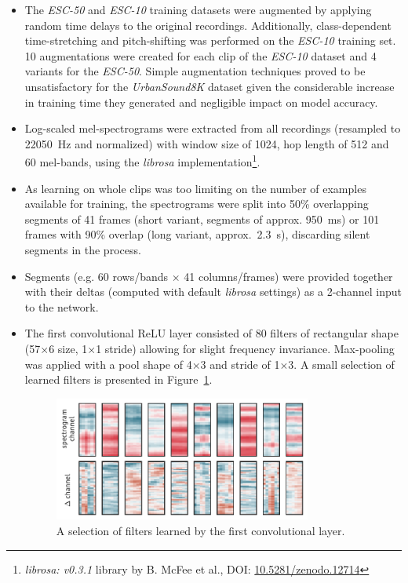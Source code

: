\documentclass{article}
\begin{document}
\begin{itemize}[noitemsep,topsep=0pt,leftmargin=12pt]
\itemsep0em
\item The \textit{ESC-50} and \textit{ESC-10} training datasets were augmented by applying random time delays to the original recordings. Additionally, class-dependent time-stretching and pitch-shifting was performed on the \textit{ESC-10} training set. 10 augmentations were created for each clip of the \textit{ESC-10} dataset and 4 variants for the \textit{ESC-50}. Simple augmentation techniques proved to be unsatisfactory for the \textit{UrbanSound8K} dataset given the considerable increase in training time they generated and negligible impact on model accuracy.

\item Log-scaled mel-spectrograms were extracted from all recordings (resampled to 22050~Hz and normalized) with window size of 1024, hop length of 512 and 60 mel-bands, using the \textit{librosa} implementation\footnote{\textit{librosa: v0.3.1} library by B. McFee et al., DOI: \href{http://dx.doi.org/10.5281/zenodo.12714}{10.5281/zenodo.12714}}.

\item As learning on whole clips was too limiting on the number of examples available for training, the spectrograms were split into 50\% overlapping segments of 41 frames (short variant, segments of approx. 950~ms) or 101 frames with 90\% overlap (long variant, approx.~2.3~s), discarding silent segments in the process.

\item Segments (e.g. 60 rows/bands $\times$ 41 columns/frames) were provided together with their deltas (computed with default \textit{librosa} settings) as a 2-channel input to the network.

\item The first convolutional ReLU layer consisted of 80 filters of rectangular shape (57$\times$6 size, 1$\times$1 stride) allowing for slight frequency invariance. Max-pooling was applied with a pool shape of 4$\times$3 and stride of 1$\times$3. A small selection of learned filters is presented in Figure~\ref{fig:filters}.

\begin{figure}[!h]
\vspace{-6pt}
\centering
\includegraphics[width=20pc]{Figures/Filters.pdf}
\caption{\label{fig:filters}A selection of filters learned by the first convolutional layer.}
\end{figure}


\end{itemize}
\end{document}
